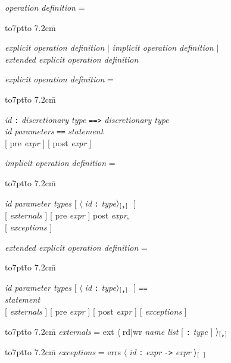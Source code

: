 \documentclass[a4paper]{jsarticle}
\newcommand{\K}[1]{{\sf #1}}
\newcommand{\id}[1]{{\it #1\/}}
\newcommand{\AL}{$\langle\;$}
\newcommand{\AR}[1]{$\rangle_{[\hbox{\tt#1}]}\;$}
\newcommand{\RMor}{{$|$}}
\newenvironment{tabbingone}[0]{
\begingroup
  \parskip=0pt
  \topsep=0pt
  \partopsep=0pt
  \begin{tabbing}
    \hbox to7pt{}\=%
    \hbox to 7.2cm{}\=%
    \kill
    \+ %
    \kill
}{
  \end{tabbing}
\endgroup}
\begin{document}
\id{operation definition} =
\begin{tabbingone}
  \id{explicit operation definition} \RMor{}
  \id{implicit operation definition} \RMor{} \\
  \id{extended explicit operation definition} \\
\end{tabbingone}

\id{explicit operation definition} = 
\begin{tabbingone}
  \id{id} {\tt:} \id{discretionary type} {\tt==>} \id{discretionary type} \\
  \id{id} \id{parameters} {\tt==} \id{statement} \\
  {}[ \K{pre} \id{expr} ]
  {}[ \K{post} \id{expr} ] \> \\
\end{tabbingone}

\id{implicit operation definition} = 
\begin{tabbingone}
  \id{id} \id{parameter types}
  {}[ \AL\id{id} {\tt:} \id{type}\AR{,} ] \\
  {}[ \id{externals} ]
  {}[ \K{pre} \id{expr} ] 
  \K{post} \id{expr},  \\
  {}[ \id{exceptions} ] \\
\end{tabbingone}

\id{extended explicit operation definition} = 
\begin{tabbingone}
   \id{id} \id{parameter types} 
  {}[ \AL\id{id} {\tt:} \id{type}\AR{,} ] {\tt==}\\
  \id{statement} \\
  {}[ \id{externals} ]
  {}[ \K{pre} \id{expr} ] 
  {}[ \K{post} \id{expr} ] {}[ \id{exceptions} ] \> \\
\end{tabbingone}

\begin{tabbingone}\-\kill
\id{externals} = 
  \K{ext} \AL \K{rd}\RMor\K{wr} \id{name list} [ {\tt:} \id{type} ] \AR{,}   \\
\end{tabbingone}

\begin{tabbingone}\-\kill
\id{exceptions} = 
  \K{errs} \AL \id{id} {\tt:} \id{expr} {\tt->} \id{expr} \AR{\ }  \\
\end{tabbingone}

\end{document}
